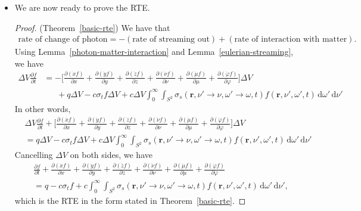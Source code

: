 \documentclass[10pt]{article}
\newcommand{\dee}{\mathrm{d}}
\newcommand{\ve}[1]{\mathbf{#1}}
\newcommand{\ra}{\rightarrow}
\begin{document}
\begin{itemize}
    \item We are now ready to prove the RTE.
    \begin{proof}

    (Theorem~\ref{basic-rte}) We have that
    \begin{align*}
      \mbox{rate of change of photon} = -(\mbox{rate of streaming out}) + (\mbox{rate of interaction with matter}).
    \end{align*}
    Using Lemma~\ref{photon-matter-interaction} and Lemma~\ref{eulerian-streaming}, we have
    \begin{align*}
      \Delta V \frac{\partial f}{\partial t}
      &= -\bigg[ 
          \frac{\partial (\dot x f)}{\partial x}
          + \frac{\partial (\dot y f)}{\partial y}
          + \frac{\partial (\dot z f)}{\partial z}
          + \frac{\partial (\dot \nu f)}{\partial \nu}
          + \frac{\partial (\dot \mu f)}{\partial \mu}
          + \frac{\partial (\dot \varphi f)}{\partial \varphi}
          \bigg] \Delta V\\
      &\phantom{\ =} + q\Delta V - c \sigma_t f \Delta V + c \Delta V \int_{0}^\infty \int_{S^2} \sigma_s(\ve{r}, \nu' \ra \nu, \omega' \ra \omega, t) f(\ve{r}, \nu', \omega', t)\, \dee \omega'\, \dee \nu'
    \end{align*}
    In other words,
    \begin{align*}
      &\Delta V \frac{\partial f}{\partial t}
      +\bigg[ 
          \frac{\partial (\dot x f)}{\partial x}
          + \frac{\partial (\dot y f)}{\partial y}
          + \frac{\partial (\dot z f)}{\partial z}
          + \frac{\partial (\dot \nu f)}{\partial \nu}
          + \frac{\partial (\dot \mu f)}{\partial \mu}
          + \frac{\partial (\dot \varphi f)}{\partial \varphi}
          \bigg] \Delta V\\
      &= q\Delta V - c \sigma_t f \Delta V + c \Delta V \int_{0}^\infty \int_{S^2} \sigma_s(\ve{r}, \nu' \ra \nu, \omega' \ra \omega, t) f(\ve{r}, \nu', \omega', t)\, \dee \omega'\, \dee \nu'
    \end{align*}
    Cancelling $\Delta V$ on both sides, we have
    \begin{align*}
      & \frac{\partial f}{\partial t}      
      + \frac{\partial (\dot x f)}{\partial x}
      + \frac{\partial (\dot y f)}{\partial y}
      + \frac{\partial (\dot z f)}{\partial z}
      + \frac{\partial (\dot \nu f)}{\partial \nu}
      + \frac{\partial (\dot \mu f)}{\partial \mu}
      + \frac{\partial (\dot \varphi f)}{\partial \varphi}\\
      &= q - c \sigma_t f + c \int_{0}^\infty \int_{S^2} \sigma_s(\ve{r}, \nu' \ra \nu, \omega' \ra \omega, t) f(\ve{r}, \nu', \omega', t)\, \dee \omega'\, \dee \nu',
    \end{align*}
    which is the RTE in the form stated in Theorem~\ref{basic-rte}.    
    \end{proof}          
  \end{itemize}
\end{document}
